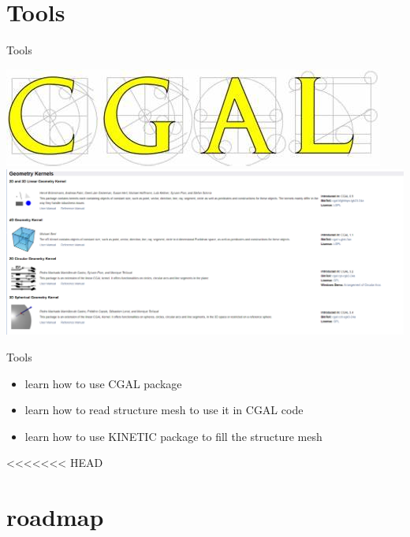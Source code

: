 \documentclass[10pt]{beamer}
\begin{document}
\section{Tools}
\begin{frame}{Tools}
    
    \includegraphics[scale = 0.2]{../../images/CGAL_logo.png}
    \includegraphics[scale =   0.3 ]{../../images/exemple.png}

\end{frame}



\begin{frame}[plain]{Tools}
    \begin{itemize}
        \item learn how to use CGAL package
        \item learn how to read structure mesh to use it in CGAL code
        \item learn how to use KINETIC package to fill the structure mesh  
    \end{itemize}
\end{frame}
<<<<<<< HEAD
\section{roadmap}

\end{document}
